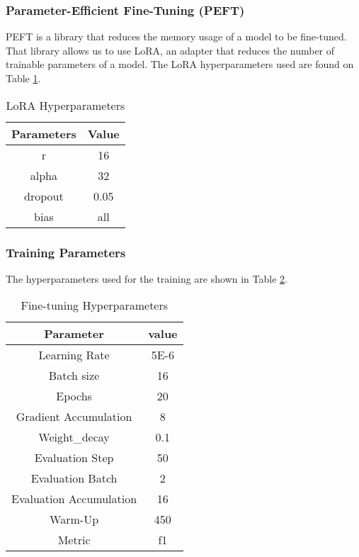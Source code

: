 \subsubsection{Parameter-Efficient Fine-Tuning (PEFT)}
PEFT is a library that reduces the memory usage of a model to be fine-tuned. That library allows us to use LoRA, an adapter that reduces the number of trainable parameters of a model. The LoRA hyperparameters used are found on Table \ref{table:LoRA}.

\begin{table}[H]
	\centering
	\caption{LoRA Hyperparameters}
	\begin{tabular}{|| c | c||} 
		\hline
		\textbf{Parameters} & \textbf{Value} \\
		\hline
		r & 16 \\
		\hline
		alpha & 32  \\
		\hline
		dropout & 0.05  \\
		\hline
		bias & all  \\
		\hline
	\end{tabular}
	\label{table:LoRA}
\end{table}

\subsubsection{Training Parameters}
The hyperparameters used for the training are shown in Table \ref{table:hyperparameters}.

\begin{table}[H]
	\centering
	\caption{Fine-tuning Hyperparameters}
	{\small
	\begin{tabular}{||c | c||} 
		\hline
		\textbf{Parameter} & \textbf{value} \\ 
		\hline
		Learning Rate & 5E-6  \\
		\hline
		Batch size & 16  \\
		\hline
		Epochs & 20 \\
		\hline
		Gradient Accumulation & 8 \\
		\hline
		Weight\_decay & 0.1 \\
		\hline
		Evaluation Step & 50 \\
		\hline
		Evaluation Batch & 2 \\
		\hline
		Evaluation Accumulation & 16 \\
		\hline
		Warm-Up & 450 \\
		\hline
		Metric & f1 \\
		\hline
	\end{tabular}
	}
	\label{table:hyperparameters}
\end{table}

